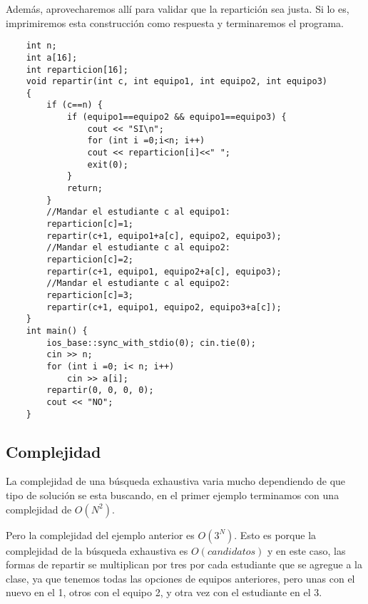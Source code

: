 Además, aprovecharemos allí para validar que la repartición sea justa. Si lo es, imprimiremos esta construcción como respuesta y terminaremos el programa.
\pagebreak
\begin{lstlisting}
	int n;
	int a[16];
	int reparticion[16];
	void repartir(int c, int equipo1, int equipo2, int equipo3) 
	{
		if (c==n) {
			if (equipo1==equipo2 && equipo1==equipo3) {
				cout << "SI\n";
				for (int i =0;i<n; i++) 
				cout << reparticion[i]<<" ";					
				exit(0);
			}
			return;
		}
		//Mandar el estudiante c al equipo1:
		reparticion[c]=1;
		repartir(c+1, equipo1+a[c], equipo2, equipo3);		
		//Mandar el estudiante c al equipo2:
		reparticion[c]=2;
		repartir(c+1, equipo1, equipo2+a[c], equipo3);		
		//Mandar el estudiante c al equipo2:
		reparticion[c]=3;
		repartir(c+1, equipo1, equipo2, equipo3+a[c]);
	}
	int main() {
		ios_base::sync_with_stdio(0); cin.tie(0);
		cin >> n;
		for (int i =0; i< n; i++) 
			cin >> a[i];		
		repartir(0, 0, 0, 0);
		cout << "NO";
	}	
\end{lstlisting}

\subsection{Complejidad}

La complejidad de una búsqueda exhaustiva varia mucho dependiendo de que tipo de solución se esta buscando, en el primer ejemplo terminamos con una complejidad de \(O(N^2)\). 

Pero la complejidad del ejemplo anterior es \(O(3^N)\). Esto es porque la complejidad de la búsqueda exhaustiva es \(O(candidatos)\) y en este caso, las formas de repartir se multiplican por tres por cada estudiante que se agregue a la clase, ya que tenemos todas las opciones de equipos anteriores, pero unas con el nuevo en el 1, otros con el equipo 2, y otra vez con el estudiante en el 3.


%	
%
%
%	
